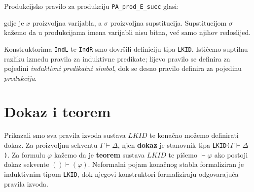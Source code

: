 \begin{example}
  Produkcijsko pravilo za produkciju \texttt{PA\_prod\_E\_succ} glasi:
  \begin{prooftree}
  \end{prooftree}
  \noindent gdje je \(x\) proizvoljna varijabla, a \(\sigma\) proizvoljna supstitucija.
  Supstitucijom \(\sigma\) kažemo da u produkcijama imena varijabli nisu bitna,
  već samo njihov redoslijed.
\end{example}

Konstruktorima \texttt{IndL} te \texttt{IndR} smo dovršili definiciju tipa \texttt{LKID}.
Ističemo suptilnu razliku između pravila za induktivne predikate;
lijevo pravilo se definira za pojedini \textit{induktivni predikatni simbol},
dok se desno pravilo definira za pojedinu \textit{produkciju}.

\section{Dokaz i teorem}
Prikazali smo sva pravila izvoda sustava \(\mathit{LKID}\) te konačno možemo definirati dokaz.
Za proizvoljnu sekventu \(\Gamma \vdash \Delta\), njen \textbf{dokaz} je stanovnik tipa \texttt{LKID(\(\Gamma \vdash \Delta\))}.
Za formulu \(\varphi\) kažemo da je \textbf{teorem} sustava \(\mathit{LKID}\) te
pišemo \(\vdash \varphi\) ako postoji dokaz sekvente \( () \vdash (\varphi)\).
Neformalni pojam konačnog stabla formaliziran je induktivnim tipom \texttt{LKID},
dok njegovi konstruktori formaliziraju odgovarajuća pravila izvoda.

